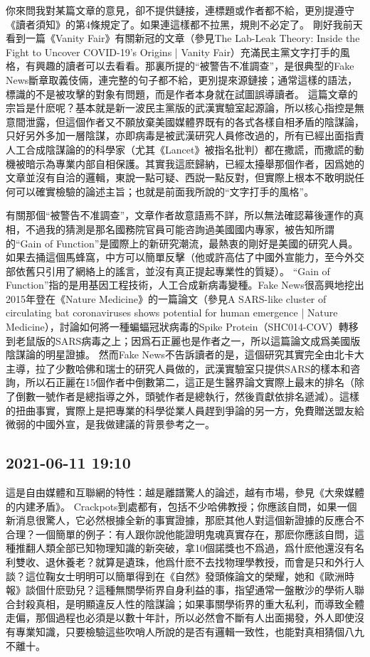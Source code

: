 \documentclass[twocolumn]{ctexart}
\begin{document}
你來問我對某篇文章的意見，卻不提供鏈接，連標題或作者都不給，更別提遵守《讀者須知》的第4條規定了。如果連這樣都不拉黑，規則不必定了。
剛好我前天看到一篇《Vanity Fair》有關新冠的文章（參見The Lab-Leak Theory: Inside the Fight to Uncover COVID-19’s Origins | Vanity Fair）充滿民主黨文字打手的風格，有興趣的讀者可以去看看。那裏所提的“被警告不准調查”，是很典型的Fake News斷章取義伎倆，連完整的句子都不給，更別提來源鏈接；通常這樣的語法，標識的不是被攻擊的對象有問題，而是作者本身就在試圖誤導讀者。
這篇文章的宗旨是什麽呢？基本就是新一波民主黨版的武漢實驗室起源論，所以核心指控是無意間泄露，但這個作者又不願放棄美國媒體界既有的各式各樣自相矛盾的陰謀論，只好另外多加一層陰謀，亦即病毒是被武漢研究人員修改過的，所有已經出面指責人工合成陰謀論的的科學家（尤其《Lancet》被指名批判）都在撒謊，而撒謊的動機被暗示為專業内部自相保護。其實我這麽歸納，已經太擡舉那個作者，因爲她的文章並沒有自洽的邏輯，東說一點可疑、西説一點反對，但實際上根本不敢明説任何可以確實檢驗的論述主旨；也就是前面我所說的“文字打手的風格”。

有關那個“被警告不准調查”，文章作者故意語焉不詳，所以無法確認幕後運作的真相，不過我的猜測是那名國務院官員可能咨詢過美國國内專家，被告知所謂的“Gain of Function”是國際上的新研究潮流，最熱衷的剛好是美國的研究人員。如果去捅這個馬蜂窩，中方可以簡單反擊（他或許高估了中國外宣能力，至今外交部依舊只引用了網絡上的謠言，並沒有真正提起專業性的質疑）。
“Gain of Function”指的是用基因工程技術，人工合成新病毒變種。Fake News很高興地挖出2015年登在《Nature Medicine》的一篇論文（參見A SARS-like cluster of circulating bat coronaviruses shows potential for human emergence | Nature Medicine），討論如何將一種蝙蝠冠狀病毒的Spike Protein（SHC014-COV）轉移到老鼠版的SARS病毒之上；因爲石正麗也是作者之一，所以這篇論文成爲美國版陰謀論的明星證據。
然而Fake News不告訴讀者的是，這個研究其實完全由北卡大主導，拉了少數哈佛和瑞士的研究人員做的，武漢實驗室只提供SARS的樣本和咨詢，所以石正麗在15個作者中倒數第二，這正是生醫界論文實際上最末的排名（除了倒數一號作者是總指導之外，頭號作者是總執行，然後貢獻依排名遞減）。這樣的扭曲事實，實際上是把專業的科學從業人員趕到爭論的另一方，免費贈送盟友給微弱的中國外宣，是我做建議的背景參考之一。
\subsection*{2021-06-11 19:10}

這是自由媒體和互聯網的特性：越是離譜驚人的論述，越有市場，參見《大衆媒體的内建矛盾》。
Crackpots到處都有，包括不少哈佛教授；你應該自問，如果一個新消息很驚人，它必然根據全新的事實證據，那麽其他人對這個新證據的反應合不合理？一個簡單的例子：有人跟你說他能證明鬼魂真實存在，那麽你應該自問，這種推翻人類全部已知物理知識的新突破，拿10個諾獎也不爲過，爲什麽他還沒有名利雙收、退休養老？就算是遺珠，他爲什麽不去找物理學教授，而會是只和外行人談？這位鞠女士明明可以簡單得到在《自然》發頭條論文的榮耀，她和《歐洲時報》談個什麽勁兒？這種無關學術界自身利益的事，指望通常一盤散沙的學術人聯合封殺真相，是明顯違反人性的陰謀論；如果事關學術界的重大私利，而導致全體走偏，那個過程也必須是以數十年計，所以必然會不斷有人出面揭發，外人即使沒有專業知識，只要檢驗這些吹哨人所說的是否有邏輯一致性，也能對真相猜個八九不離十。
\end{document}
